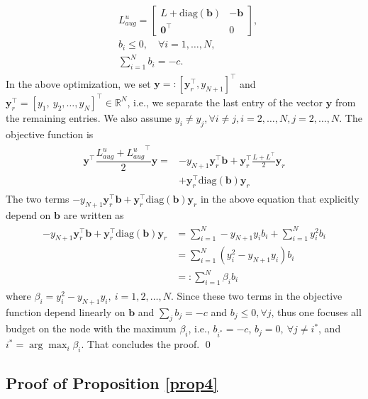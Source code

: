 \documentclass[%
 reprint,
 amsmath,amssymb,
 aip,
]{revtex4-2}
\def \by {\pmb{y}}
\def \bb {\pmb{b}}
\def \diag {\text{diag}}
\theoremstyle{italichead}
\theoremstyle{definition}
\begin{document}
{\begin{align}
\begin{split}
            & L_{aug}^u = \begin{bmatrix}
                L + \text{diag}(\bb) & -\bb \\
                \pmb{0}^\top & 0
            \end{bmatrix}, \\
            & b_i \leq 0, \quad \forall i = 1, \hdots, N,\\
            & \sum_{i=1}^N b_i = -c.
        \end{split}
        \end{align}
In the above optimization, we set $\by = : [\by_r^\top, y_{N+1}]^\top$ and $\by_r^\top = [y_1, \ y_2, \hdots, y_N]^\top \in \mathbb{R}^N$, i.e., we separate the last entry of the vector $\by$ from the remaining entries.
We also assume $y_i \neq y_j, \forall i\neq j, i= 2, \hdots, N, j = 2, \hdots, N.$
The objective function is
\begin{align}
\begin{split}
    \by^\top \dfrac{{L_{aug}^u}+{L_{aug}^u}^\top}{2} \by = & -y_{N+1} \by_r^\top \bb + \by_r^\top \frac{L+L^\top}{2} \by_r \\ 
    & +\by_r^\top \diag(\bb) \by_r
\end{split}
\end{align}
The two terms $-y_{N+1} \by_r^\top \bb +\by_r^\top \diag(\bb) \by_r$ in the above equation that explicitly depend on $\bb$ are written as
\begin{align}
\begin{split}
    -y_{N+1} \by_r^\top \bb + \by_r^\top \diag(\bb) \by_r & = \sum_{i=1}^N - y_{N+1} y_i b_i  + \sum_{i=1}^N y_i^2 b_i \\
    & = \sum_{i=1}^N \left( y_i^2 - y_{N+1} y_i  \right) b_i \\
    & =: \sum_{i=1}^N \beta_i b_i
\end{split}
\end{align}
where $\beta_i =  y_i^2 - y_{N+1} y_i, \ i = 1, 2, \hdots, N$.
Since these two terms in the objective function depend linearly on $\bb$ and $\sum_j b_j = -c$ and $b_j \leq 0, \forall j$, thus one focuses all budget on the node with the maximum $\beta_i$, i.e., $b_{i^*} = - c$, $b_j = 0, \ \forall j \neq i^*$, and $i^* = \arg \max_i \beta_i$. 
That concludes the proof. \hfill \qed


\subsection{Proof of Proposition \ref{prop4}} \label{sec:prop4}

}
\end{document}
